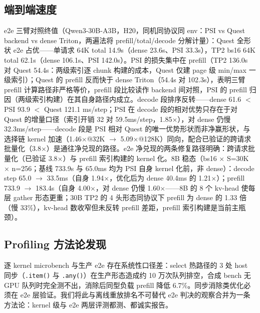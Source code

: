 \documentclass[11pt]{article}
\begin{document}
\subsection{端到端速度}

e2e 三臂对照终值（Qwen3-30B-A3B，H20，同机同协议同 env：PSI vs Quest backend vs dense Triton，两遍法将 prefill/total/decode 分解计量）：Quest 全形状 e2e 占优——单请求 64K total 14.9s（dense 23.6s、PSI 33.3s），TP2 bs16 64K total 62.1s（dense 106.1s、PSI 142.0s）。PSI 的损失集中在 prefill（TP2 136.0s 对 Quest 54.4s：两级索引逐 chunk 构建的成本，Quest 仅建 page 级 min/max 一级索引）；Quest 的 prefill 反而快于 dense Triton（54.4s 对 102.3s），表明三臂 prefill 计算路径非严格等价，prefill 段比较读作 backend 间对照，PSI 的 prefill 归因（两级索引构建）在其自身路径内成立。decode 段排序反转——dense 61.6 $<$ PSI 93.9 $<$ Quest 121.1 ms/step；PSI 在 decode 段的相对优势只存在于对 Quest 的增量口径（索引开销 32 对 59.5ms/step，1.85$\times$），对 dense 仍慢 32.3ms/step——decode 段是 PSI 相对 Quest 的唯一优势形状而非净赢形状，与选择链 kernel 加速（1.46$\times$@32K $\rightarrow$ 5.09$\times$@128K）同向，配合已验证的跨请求批量化（3.8$\times$）是通往净兑现的路径。e2e 净兑现的两条修复路径明确：跨请求批量化（已验证 3.8$\times$）与 prefill 索引构建的 kernel 化。8B 稳态（bs16 $\times$ S=30K $\times$ n=256；基线 733.9s 与 65.0ms 均为 PSI 自身 kernel 化前，非 dense）：decode step 65.0 $\rightarrow$ 33.5ms（自身 1.94$\times$，优化后为 dense 40.4ms 的 1.21$\times$）；prefill 733.9 $\rightarrow$ 183.4s（自身 4.00$\times$，对 dense 仍慢 1.60$\times$——8B 的 8 个 kv-head 使每层 gather 形态更重；30B TP2 的 4 头形态同协议下 prefill 为 dense 的 1.33 倍（慢 33\%），kv-head 数收窄但未反转 prefill 差距，prefill 索引构建是当前主瓶颈）。

\subsection{Profiling 方法论发现}

逐 kernel microbench 与生产 e2e 存在系统性口径差：select 热路径的 3 处 host 同步（\texttt{.item()} 与 \texttt{.any()}）在生产形态造成约 10 万次队列排空，合成 bench 无 GPU 队列时完全测不出，消除后同型负载 prefill 降低 6.7\%。同步消除类优化必须在 e2e 层验证。我们将此与离线重放排名不可替代 e2e 判决的观察合并为一条方法论：kernel 级与 e2e 两层评测都测、都诚实报告。

\end{document}
